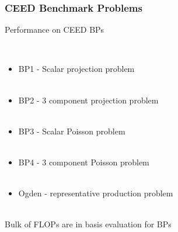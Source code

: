 \documentclass{beamer}
\begin{document}

\begin{frame}
\begin{center}
\frametitle{CEED Benchmark Problems}

Performance on CEED BPs

~\\

\begin{itemize}

\item BP1 - Scalar projection problem\\

~\\

\item BP2 - 3 component projection problem\\

~\\

\item BP3 - Scalar Poisson problem\\

~\\

\item BP4 - 3 component Poisson problem\\

~\\

\item Ogden - representative production problem\\

\end{itemize}

~\\

Bulk of FLOPs are in basis evaluation for BPs

\end{center}
\end{frame}

\end{document}
